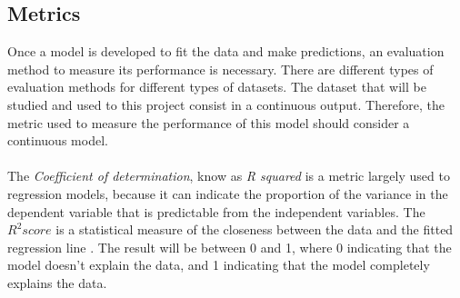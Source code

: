 \subsection{Metrics}
\label{sec:metrics}
Once a model is developed to fit the data and make predictions, an evaluation method to measure its performance is necessary. There are different types of evaluation methods for different types
of datasets. The dataset that will be studied and used to this project consist in a continuous output. Therefore, the metric used to measure the performance of this model should consider a continuous model.\\
\newline
\\
The \textit{Coefficient of determination}, know as \textit{R squared} is a metric largely used to regression models, because it can indicate the proportion of the variance in the dependent variable
that is predictable from the independent variables\cite{R2_1}.
The $R^2 score$ is a statistical measure of the closeness between the data and the fitted regression line \cite{R2}. The result will be between 0 and 1, where 0 indicating that the model doesn't explain 
the data, and 1 indicating that the model completely explains the data.\\
